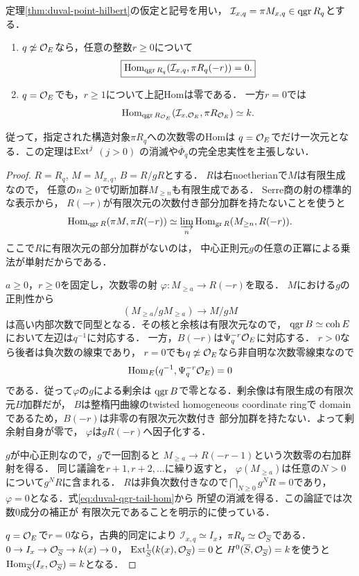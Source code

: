 \begin{theorem}
\label{thm:duval-qgr-hom-vanishing}
定理\ref{thm:duval-point-hilbert}の仮定と記号を用い，
$\mathcal I_{x,q}=\pi M_{x,q}\in\operatorname{qgr} R_q$とする．
\begin{enumerate}
\item $q\not\simeq\mathcal O_E$なら，任意の整数$r\ge0$について
\[
 \boxed{\operatorname{Hom}_{\operatorname{qgr} R_q}(\mathcal I_{x,q},\pi R_q(-r))=0.}
\]
\item $q=\mathcal O_E$でも，$r\ge1$について上記Homは零である．
一方$r=0$では
\[
 \operatorname{Hom}_{\operatorname{qgr} R_{\mathcal O_E}}(\mathcal I_{x,\mathcal O_E},\pi R_{\mathcal O_E})
 \simeq k.
\]
\end{enumerate}
従って，指定された構造対象$\pi R_q$への次数零のHomは
$q=\mathcal O_E$でだけ一次元となる．この定理は$\operatorname{Ext}^j$ $(j>0)$
の消滅や$\overline\Phi_q$の完全忠実性を主張しない．
\end{theorem}
\begin{proof}
$R=R_q$, $M=M_{x,q}$, $B=R/gR$とする．
$R$は右noetherianで$M$は有限生成なので，
任意の$n\ge0$で切断加群$M_{\ge n}$も有限生成である．
Serre商の射の標準的な表示\cite{AZ}から，
$R(-r)$が有限次元の次数付き部分加群を持たないことを使うと
\begin{equation}\label{eq:duval-qgr-tail-hom}
 \operatorname{Hom}_{\operatorname{qgr} R}(\pi M,\pi R(-r))
 \simeq\varinjlim_n\operatorname{Hom}_{\operatorname{gr} R}(M_{\ge n},R(-r)).
\end{equation}
ここで$R$に有限次元の部分加群がないのは，
中心正則元$g$の任意の正冪による乗法が単射だからである．

$a\ge0$，$r\ge0$を固定し，次数零の射
$\varphi:M_{\ge a}\to R(-r)$を取る．
$M$における$g$の正則性から
\[
 (M_{\ge a}/gM_{\ge a})\longrightarrow M/gM
\]
は高い内部次数で同型となる．その核と余核は有限次元なので，
$\operatorname{qgr} B\simeq\operatorname{coh} E$において左辺は$q^{-1}$に対応する．
一方，$B(-r)$は$\Psi_q^{-r}\mathcal O_E$に対応する．
$r>0$なら後者は負次数の線束であり，
$r=0$でも$q\not\simeq\mathcal O_E$なら非自明な次数零線束なので
\[
 \operatorname{Hom}_E(q^{-1},\Psi_q^{-r}\mathcal O_E)=0
\]
である．従って$\varphi$の$g$による剰余は
$\operatorname{qgr} B$で零となる．剰余像は有限生成の有限次元$B$加群だが，
$B$は整楕円曲線のtwisted homogeneous coordinate ringで
domainであるため，$B(-r)$は非零の有限次元次数付き
部分加群を持たない．よって剰余射自身が零で，
$\varphi$は$gR(-r)$へ因子化する．

$g$が中心正則なので，$g$で一回割ると
$M_{\ge a}\to R(-r-1)$という次数零の右加群射を得る．
同じ議論を$r+1,r+2,\ldots$に繰り返すと，
$\varphi(M_{\ge a})$は任意の$N>0$について$g^NR$に含まれる．
$R$は非負次数付きなので$\bigcap_{N\ge0}g^NR=0$であり，
$\varphi=0$となる．式\eqref{eq:duval-qgr-tail-hom}から
所望の消滅を得る．この論証では次数$0$成分の補正が
有限次元であることを明示的に使っている．

$q=\mathcal O_E$で$r=0$なら，古典的同定により
$\mathcal I_{x,q}\simeq I_x$，$\pi R_q\simeq\mathcal O_{\overline S}$である．
$0\to I_x\to\mathcal O_{\overline S}\to k(x)\to0$，
$\operatorname{Ext}^1_{\overline S}(k(x),\mathcal O_{\overline S})=0$と
$H^0(\overline S,\mathcal O_{\overline S})=k$を使うと
$\operatorname{Hom}_{\overline S}(I_x,\mathcal O_{\overline S})=k$となる．
\end{proof}

